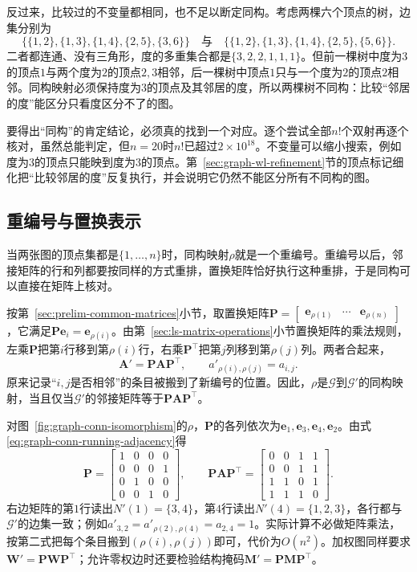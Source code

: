 反过来，比较过的不变量都相同，也不足以断定同构。考虑两棵六个顶点的树，边集分别为
\[
\bigl\{\{1,2\},\{1,3\},\{1,4\},\{2,5\},\{3,6\}\bigr\}
\quad\text{与}\quad
\bigl\{\{1,2\},\{1,3\},\{1,4\},\{2,5\},\{5,6\}\bigr\}.
\]
二者都连通、没有三角形，度的多重集合都是$\{3,2,2,1,1,1\}$。但前一棵树中度为$3$的顶点$1$与两个度为$2$的顶点$2,3$相邻，后一棵树中顶点$1$只与一个度为$2$的顶点$2$相邻。同构映射必须保持度为$3$的顶点及其邻居的度，所以两棵树不同构：比较“邻居的度”能区分只看度区分不了的图。

要得出“同构”的肯定结论，必须真的找到一个对应。逐个尝试全部$n!$个双射再逐个核对，虽然总能判定，但$n=20$时$n!$已超过$2\times10^{18}$。不变量可以缩小搜索，例如度为$3$的顶点只能映到度为$3$的顶点。第~\ref{sec:graph-wl-refinement}节的顶点标记细化把“比较邻居的度”反复执行，并会说明它仍然不能区分所有不同构的图。

\subsection{重编号与置换表示}
\label{sec:graph-conn-relabeling}

当两张图的顶点集都是$\{1,\ldots,n\}$时，同构映射$\rho$就是一个重编号。重编号以后，邻接矩阵的行和列都要按同样的方式重排，置换矩阵恰好执行这种重排，于是同构可以直接在矩阵上核对。

按第~\ref{sec:prelim-common-matrices}小节，取置换矩阵$\bm P=\begin{bmatrix}\bm e_{\rho(1)}&\cdots&\bm e_{\rho(n)}\end{bmatrix}$，它满足$\bm P\bm e_i=\bm e_{\rho(i)}$。由第~\ref{sec:ls-matrix-operations}小节置换矩阵的乘法规则，左乘$\bm P$把第$i$行移到第$\rho(i)$行，右乘$\bm P^{\top}$把第$j$列移到第$\rho(j)$列。两者合起来，
\begin{equation}
\bm A'=\bm P\bm A\bm P^{\top},\qquad
a'_{\rho(i),\rho(j)}=a_{i,j}.
\label{eq:graph-conn-relabel}
\end{equation}
原来记录“$i,j$是否相邻”的条目被搬到了新编号的位置。因此，$\rho$是$\mathcal G$到$\mathcal G'$的同构映射，当且仅当$\mathcal G'$的邻接矩阵等于$\bm P\bm A\bm P^{\top}$。

对图~\ref{fig:graph-conn-isomorphism}的$\rho$，$\bm P$的各列依次为$\bm e_1,\bm e_3,\bm e_4,\bm e_2$。由式\eqref{eq:graph-conn-running-adjacency}得
\[
\bm P=
\begin{bmatrix}
1&0&0&0\\
0&0&0&1\\
0&1&0&0\\
0&0&1&0
\end{bmatrix},\qquad
\bm P\bm A\bm P^{\top}=
\begin{bmatrix}
0&0&1&1\\
0&0&1&1\\
1&1&0&1\\
1&1&1&0
\end{bmatrix}.
\]
右边矩阵的第$1$行读出$N'(1)=\{3,4\}$，第$4$行读出$N'(4)=\{1,2,3\}$，各行都与$\mathcal G'$的边集一致；例如$a'_{3,2}=a'_{\rho(2),\rho(4)}=a_{2,4}=1$。实际计算不必做矩阵乘法，按第二式把每个条目搬到$(\rho(i),\rho(j))$即可，代价为$O(n^2)$。加权图同样要求$\bm W'=\bm P\bm W\bm P^{\top}$；允许零权边时还要检验结构掩码$\bm M'=\bm P\bm M\bm P^{\top}$。

